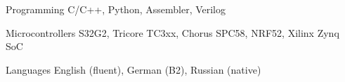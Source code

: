 


\begin{cvskills}


\cvskill
{Programming} %
{C/C++, Python, Assembler, Verilog} %


\cvskill
{Microcontrollers} %
{S32G2, Tricore TC3xx, Chorus SPC58, NRF52, Xilinx Zynq SoC} %


\cvskill
{Languages} %
{ English (fluent), German (B2), Russian (native)} %


\end{cvskills}